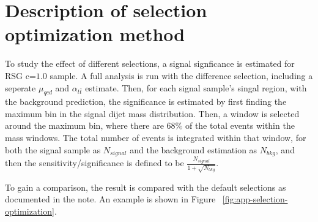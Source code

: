 \section{Description of selection optimization method}
\label{sec:app-selection-optimization}
To study the effect of different selections, a signal signficance is estimated for RSG c=$1.0$ sample. A full analysis is run with the difference selection, including a seperate $\mu_{qcd}$ and $\alpha_{t\bar{t}}$ estimate. Then, for each signal sample's singal region, with the background prediction, the significance is estimated by first finding the maximum bin in the signal dijet mass distribution. Then, a window is selected around the maximum bin, where there are $68\%$ of the total events within the mass windows. The total number of events is integrated within that window, for both the signal sample as $N_{signal}$ and the background estimation as $N_{bkg}$, and then the sensitivity/significance is defined to be $\frac{N_{signal}}{1 + \sqrt{N_{bkg}}}$.

To gain a comparison, the result is compared with the default selections as documented in the note. An example is shown in Figure ~\ref{fig:app-selection-optimization}.

\begin{figure*}[htbp!]
\begin{center}
  \caption{An example of significance comparison plot. On the top pad, the x-axis is for differnt RSG masses, while the y-axis is plotting the estimated significance. The black dot is for the $2bs$ signal region with the specified selection, the red square is for the $3b$ signal region, and the green star is for the $4b$ signal region. The red cross is the quaratic sum of the three signal regions above. And the black circile is the default selection total combined significance in this note. At the bottom pad, the x-axis is for differnt RSG masses, while the y-axis is plotting the combined estimated significance ratio of the specified selection to the refernce selection. In this case, $77\%$ working point study is compared to the reference, which has the same $b$-tagging working point. Hence all the ratios are 1.}
  \label{fig:app-selection-optimization}
\end{center}
\end{figure*}
